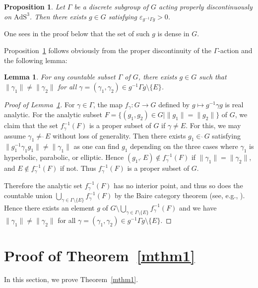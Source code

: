 \documentclass[10pt,a4paper]{amsart}
\numberwithin{equation}{section}
\newtheorem{Lemma}[Theorem]{Lemma}
\newtheorem{Proposition}[Theorem]{Proposition}
\begin{document}
\begin{Proposition}\label{strong}
Let $\Gamma$ be a discrete subgroup of $G$ acting properly discontinuously
on $\mathrm{AdS}^{3}$.
Then there exists $g \in G$
satisfying $\varepsilon_{g^{-1}\Gamma g} > 0$.
\end{Proposition}
\begin{Remark}
One sees in the proof below that
the set of such $g$ is dense in $G$.
\end{Remark}
Proposition~\ref{strong} follows obviously
from the proper discontinuity of the $\Gamma$-action and the following lemma:
\begin{Lemma}\label{weak}
For any countable subset $\Gamma$ of
$G$,
there exists
$g\in G$
such that $\|\gamma_1\|\neq\|\gamma_2\|$
for all $\gamma=(\gamma_1,\gamma_2)\in
g^{-1}\Gamma g \setminus \{E\}$.
\end{Lemma}

\begin{proof}[Proof of Lemma~\ref{weak}]
For $\gamma \in \Gamma$,
the map $f_{\gamma}\colon G \rightarrow G$ defined by $g\mapsto g^{-1}\gamma g$
is real analytic.
For the analytic subset
$F = \{(g_1,g_2) \in G
\mid \|g_1\| = \|g_2\| \}$ of $G$, we claim that
the set $f_{\gamma}^{-1}(F)$ is a proper subset of $G$ if $\gamma\neq E$.
For this, we may assume $\gamma_1 \neq \grave{\ }E$ without loss of generality.
Then there exists
$g_1 \in \grave{\ }G$ satisfying $\|g_1^{-1}\gamma_1g_1\| \neq \|
\gamma_1\|$ as one can find $g_{1}$ depending on the three cases where
$\gamma_{1}$ is hyperbolic, parabolic, or elliptic.
Hence $(g_1,\grave{\ }E)\notin f_{\gamma}^{-1}(F)$ if $\|\gamma_{1}\|=\|\gamma_{2}\|$,
and $E\notin f_{\gamma}^{-1}(F)$ if not. Thus $f_{\gamma}^{-1}(F)$ is a proper subset of $G$.

Therefore the analytic set
$f_{\gamma}^{-1}(F)$ has no interior point, and thus so does the countable union
$\bigcup_{\gamma \in \Gamma \setminus \{E\}}
 f_{\gamma}^{-1}(F)$ by the Baire category theorem
(see, e.g., \cite[Theorem~2.2]{functional-analysis}).
Hence there exists an element
$g$ of $G\setminus\bigcup_{\gamma \in \Gamma \setminus \{E\}}
 f_{\gamma}^{-1}(F)$ and we have
$\|\gamma_1\|\neq\|\gamma_2\|$
for all $\gamma=(\gamma_1,\gamma_2)\in
g^{-1}\Gamma g \setminus \{E\}$.
\end{proof}

\section{Proof of Theorem~\ref{mthm1}}\label{proof-linear-indep}
In this section, we prove Theorem~\ref{mthm1}.
\end{document}
